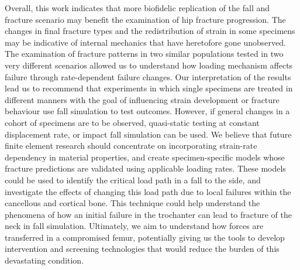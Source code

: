 Overall, this work indicates that more biofidelic replication of the fall and fracture scenario may benefit the examination of hip fracture progression.
The changes in final fracture types and the redistribution of strain in some specimens may be indicative of internal mechanics that have heretofore gone unobserved.
The examination of fracture patterns in two similar populations tested in two very different scenarios allowed us to understand how loading mechanism affects failure through rate-dependent failure changes.
Our interpretation of the results lead us to recommend that experiments in which single specimens are treated in different manners with the goal of influencing strain development or fracture behaviour use fall simulation to test outcomes.
However, if general changes in a cohort of specimens are to be observed, quasi-static testing at constant displacement rate, or impact fall simulation can be used.
We believe that future finite element research should concentrate on incorporating strain-rate dependency in material properties, and create specimen-specific models whose fracture predictions are validated using applicable loading rates.
These models could be used to identify the critical load path in a fall to the side, and investigate the effects of changing this load path due to local failures within the cancellous and cortical bone.
This technique could help understand the phenomena of how an initial failure in the trochanter can lead to fracture of the neck in fall simulation.
Ultimately, we aim to understand how forces are transferred in a compromised femur, potentially giving us the tools to develop intervention and screening technologies that would reduce the burden of this devastating condition.
